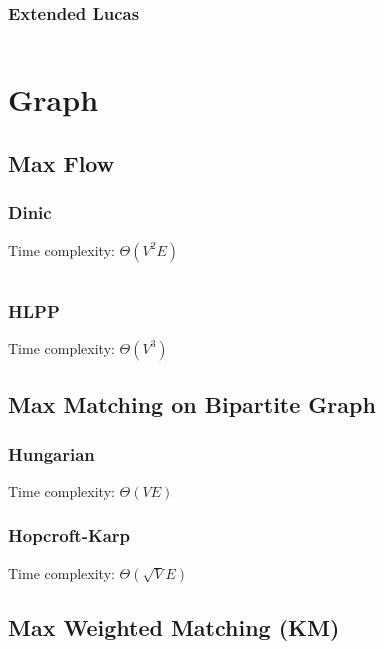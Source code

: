 \documentclass[a4paper, 11pt]{article}   	%
\begin{document}
\subsubsection{Extended Lucas}

\inputminted[breaklines, linenos]{cpp}{math/exlucas.cpp}

\section{Graph}

\subsection{Max Flow}

\subsubsection{Dinic}

Time complexity: $\Theta(V^2E)$

\inputminted[breaklines, linenos]{cpp}{graph/dinic.cpp}

\subsubsection{HLPP}

Time complexity: $\Theta(V^3)$

\subsection{Max Matching on Bipartite Graph}

\subsubsection{Hungarian}

Time complexity: $\Theta(VE)$

\subsubsection{Hopcroft-Karp}

Time complexity: $\Theta(\sqrt V E)$

\subsection{Max Weighted Matching (KM)}

\inputminted[breaklines, linenos]{cpp}{graph/km.cpp}
\end{document}

